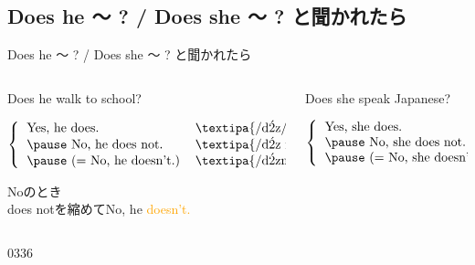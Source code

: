 \documentclass[aspectratio=169,dvipsnames]{beamer}
\newcommand{\myaudio}[1]{\href{#1}{\faVolumeUp}}
\begin{document}
\subsection{Does he 〜 ?  / Does she 〜 ? と聞かれたら}
\begin{frame}[plain]{Does he  〜 ? / Does she 〜 ? と聞かれたら}
 \large

\begin{columns}[t]
\begin{column}{.55\textwidth}
Does he walk to school?

\vspace{20pt}

\pause

\mbox{}\hspace{0pt}$\left\{\begin{tabular}{ll}
         \text{Yes, he does.}&\text{\textipa{/d\'2z/}}\\\pause
         \text{No, he does not.}&\text{\textipa{/d\'2z n\'At/}}\\\pause
         \text{(}= \text{No, he doesn't.)}&\text{\textipa{/d\'2znt/}}\\
       \end{tabular}\right.$

\pause

\vspace{10pt}

{\small Noのとき\\[-5pt]does notを縮めてNo, he \textcolor{orange}{doesn't.}}

\end{column}
\pause
\begin{column}{.435\textwidth}
Does she speak Japanese?

\vspace{20pt}

\pause

\mbox{}\hspace{40pt}$\left\{\begin{tabular}{l}
         \text{Yes, she does.}\\\pause
         \text{No, she does not.}\\\pause
           \text{(}= \text{No, she doesn't.)}
       \end{tabular}\right.$

\end{column}
\end{columns}

\hfill{\tiny 0336}\,{\scriptsize \myaudio{./audio/011_answer_do_02.mp3}}
\end{frame}
\end{document}
